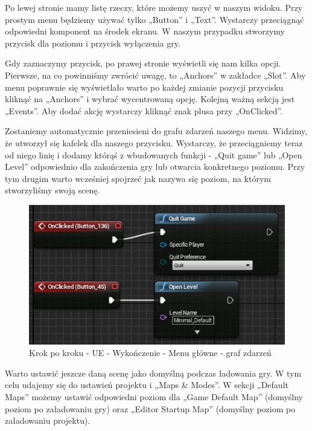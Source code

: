 \documentclass[openright]{xmgr}
\begin{document}
Po lewej stronie mamy listę rzeczy, które możemy uszyć w naszym widoku. Przy prostym menu będziemy używać tylko „Button” i „Text”. Wystarczy przeciągnąć odpowiedni komponent na środek ekranu. W naszym przypadku stworzymy przycisk dla poziomu i przycisk wyłączenia gry.

Gdy zaznaczymy przycisk, po prawej stronie wyświetli się nam kilka opcji. Pierwsze, na co powinniśmy zwrócić uwagę, to „Anchors” w zakładce „Slot”. Aby menu poprawnie się wyświetlało warto po każdej zmianie pozycji przycisku kliknąć na „Anchors” i wybrać wycentrowaną opcję. Kolejną ważną sekcją jest „Events”. Aby dodać akcję wystarczy kliknąć znak plusa przy „OnClicked”.

Zostaniemy automatycznie przeniesieni do grafu zdarzeń naszego menu. Widzimy, że utworzył się kafelek dla naszego przycisku. Wystarczy, że przeciągniemy teraz od niego linię i dodamy którąś z wbudowanych funkcji - „Quit game” lub „Open Level” odpowiednio dla zakończenia gry lub otwarcia konkretnego poziomu. Przy tym drugim warto wcześniej spojrzeć jak nazywa się poziom, na którym stworzyliśmy swoją scenę.

\begin{figure}[!htb]
    \begin{center}
    \includegraphics[scale=0.5]{Screeny/UeKrokPoKroku/MainMenuEvent}
    \end{center}
    \caption{Krok po kroku - UE - Wykończenie - Menu główne - graf zdarzeń}
\end{figure}

Warto ustawić jeszcze daną scenę jako domyślną podczas ładowania gry. W tym celu udajemy się do ustawień projektu i „Maps \& Modes”. W sekcji „Default Maps” możemy ustawić odpowiedni poziom dla „Game Default Map” (domyślny poziom po załadowaniu gry) oraz „Editor Startup Map” (domyślny poziom po załadowaniu projektu).
\end{document}
